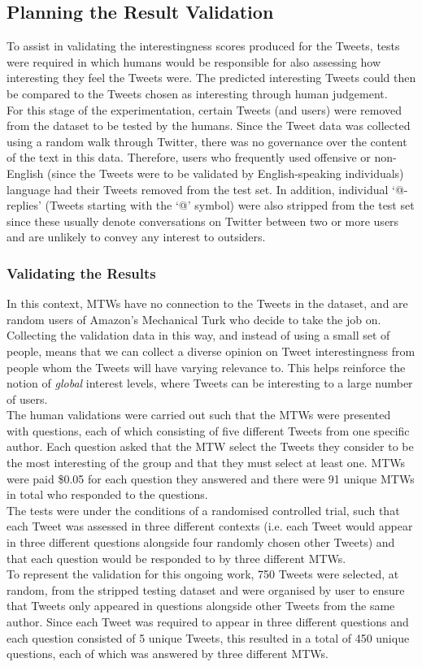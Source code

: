 \subsection{Planning the Result Validation}
To assist in validating the interestingness scores produced for the Tweets, tests were required in which humans would be responsible for also assessing how interesting they feel the Tweets were. The predicted interesting Tweets could then be compared to the Tweets chosen as interesting through human judgement.\\
For this stage of the experimentation, certain Tweets (and users) were removed from the dataset to be tested by the humans. Since the Tweet data was collected using a random walk through Twitter, there was no governance over the content of the text in this data. Therefore, users who frequently used offensive or non-English (since the Tweets were to be validated by English-speaking individuals) language had their Tweets removed from the test set. In addition, individual `@-replies' (Tweets starting with the `@' symbol) were also stripped from the test set since these usually denote conversations on Twitter between two or more users and are unlikely to convey any interest to outsiders.


\subsubsection{Validating the Results}
In this context, MTWs have no connection to the Tweets in the dataset, and are random users of Amazon's Mechanical Turk who decide to take the job on. Collecting the validation data in this way, and instead of using a small set of people, means that we can collect a diverse opinion on Tweet interestingness from people whom the Tweets will have varying relevance to. This helps reinforce the notion of \textit{global} interest levels, where Tweets can be interesting to a large number of users.\\
The human validations were carried out such that the MTWs were presented with questions, each of which consisting of five different Tweets from one specific author. Each question asked that the MTW select the Tweets they consider to be the most interesting of the group and that they must select at least one. MTWs were paid \$0.05 for each question they answered and there were 91 unique MTWs in total who responded to the questions.\\
The tests were under the conditions of a randomised controlled trial, such that each Tweet was assessed in three different contexts (i.e. each Tweet would appear in three different questions alongside four randomly chosen other Tweets) and that each question would be responded to by three different MTWs.\\
To represent the validation for this ongoing work, 750 Tweets were selected, at random, from the stripped testing dataset and were organised by user to ensure that Tweets only appeared in questions alongside other Tweets from the same author. Since each Tweet was required to appear in three different questions and each question consisted of 5 unique Tweets, this resulted in a total of 450 unique questions, each of which was answered by three different MTWs.

